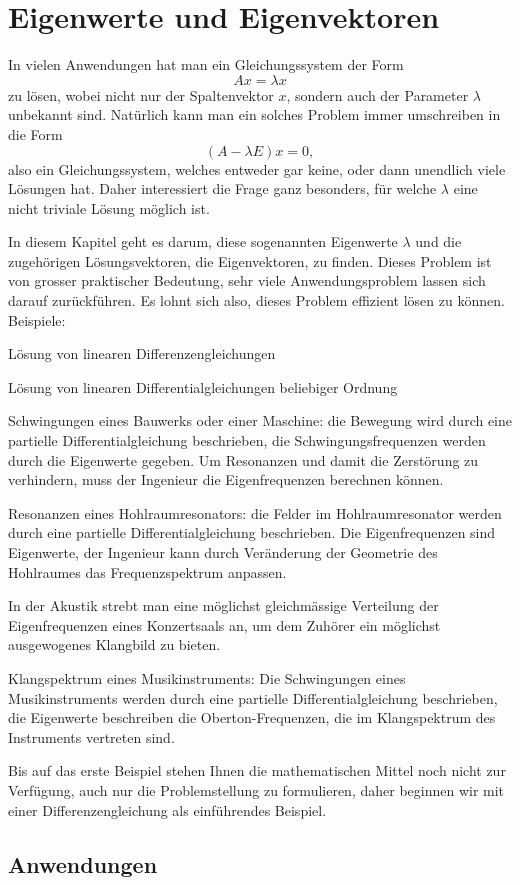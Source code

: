 %
%
%
\chapter{Eigenwerte und Eigenvektoren\label{chapter-eigen}}
In vielen Anwendungen hat man ein Gleichungssystem der Form
\[
Ax=\lambda x
\]
zu lösen, wobei nicht nur der Spaltenvektor $x$, sondern auch der
Parameter $\lambda$ unbekannt sind.
Natürlich kann man ein solches Problem immer umschreiben in die Form
\[
(A-\lambda E) x=0,
\]
also ein Gleichungssystem, welches entweder gar keine, oder dann
unendlich viele Lösungen hat.
Daher interessiert die Frage 
ganz besonders, für welche $\lambda$ eine nicht triviale Lösung möglich ist.

In diesem Kapitel geht es darum, diese sogenannten Eigenwerte $\lambda$
und die zugehörigen Lösungsvektoren, die Eigenvektoren, zu finden.
Dieses
Problem ist von grosser praktischer Bedeutung, sehr viele Anwendungsproblem
lassen sich darauf zurückführen.
Es lohnt sich also, dieses Problem
effizient lösen zu können.
Beispiele:
\begin{compactitem}
\item Lösung von linearen Differenzengleichungen
\item Lösung von linearen Differentialgleichungen beliebiger Ordnung
\item Schwingungen eines Bauwerks oder einer Maschine: die Bewegung wird durch
eine partielle Differentialgleichung beschrieben, die Schwingungsfrequenzen
werden durch die Eigenwerte gegeben.
Um Resonanzen und damit die Zerstörung
zu verhindern, muss der Ingenieur die Eigenfrequenzen
berechnen können.
\item Resonanzen eines Hohlraumresonators: die Felder im Hohlraumresonator
werden durch eine partielle Differentialgleichung beschrieben.
Die Eigenfrequenzen sind Eigenwerte, der Ingenieur kann durch Veränderung
der Geometrie des Hohlraumes das Frequenzspektrum anpassen.
\item
{}
In der
Akustik strebt man eine möglichst gleichmässige Verteilung der Eigenfrequenzen
eines Konzertsaals an, um dem Zuhörer ein möglichst ausgewogenes Klangbild
zu bieten.
\item Klangspektrum eines Musikinstruments: Die Schwingungen eines Musikinstruments
werden durch eine partielle Differentialgleichung beschrieben, die
Eigenwerte beschreiben die Oberton-Frequenzen, die im Klangspektrum des
Instruments vertreten sind.
\end{compactitem}
Bis auf das erste Beispiel stehen Ihnen die mathematischen Mittel noch nicht
zur Verfügung, auch nur die Problemstellung zu formulieren, daher beginnen
wir mit einer Differenzengleichung als einführendes Beispiel.







\section{Anwendungen}


